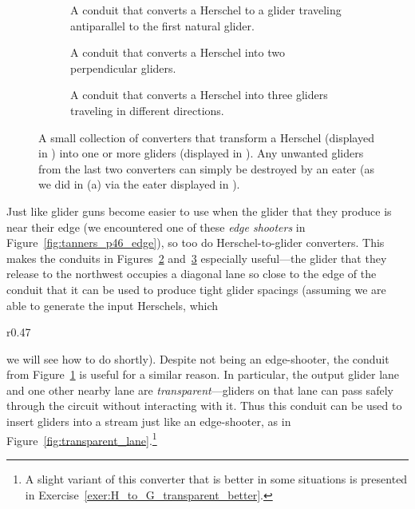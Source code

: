 \begin{figure}[!htb]
	\centering
	\begin{subfigure}{.3\textwidth}
		\centering\vspace*{0.4cm}
		\caption{A conduit that converts a Herschel to a glider traveling antiparallel to the first natural glider.}
		\label{fig:H_to_G}
	\end{subfigure}\quad%
	\begin{subfigure}{.31\textwidth}
		\centering{}
		\caption{A conduit that converts a Herschel into two perpendicular gliders.}
		\label{fig:H_to_2G}
	\end{subfigure}\quad%
	\begin{subfigure}{.31\textwidth}
		\centering{}
		\caption{A conduit that converts a Herschel into three gliders traveling in different directions.}
		\label{fig:H_to_3G}
	\end{subfigure}
	\caption{A small collection of converters that transform a Herschel (displayed in ) into one or more gliders (displayed in ). Any unwanted gliders from the last two converters can simply be destroyed by an eater (as we did in (a) via the eater displayed in ).}\label{fig:herschel_to_glider}
\end{figure}

Just like glider guns become easier to use when the glider that they produce is near their edge (we encountered one of these \emph{edge shooters} in Figure~\ref{fig:tanners_p46_edge}), so too do Herschel-to-glider converters. This makes the conduits in Figures~\ref{fig:H_to_2G} and~\ref{fig:H_to_3G} especially useful---the glider that they release to the northwest occupies a diagonal lane so close to the edge of the conduit that it can be used to produce tight glider spacings (assuming we are able to generate the input Herschels, which
\begin{wrapfigure}{r}{0.47\textwidth}
	\centering
	\caption{A conduit with a transparent lane inserting a glider into a period~$60$ stream.}\label{fig:transparent_lane}
\end{wrapfigure}
we will see how to do shortly). Despite not being an edge-shooter, the conduit from Figure~\ref{fig:H_to_G} is useful for a similar reason. In particular, the output glider lane and one other nearby lane are \emph{transparent}---gliders on that lane can pass safely through the circuit without interacting with it. Thus this conduit can be used to insert gliders into a stream just like an edge-shooter, as in Figure~\ref{fig:transparent_lane}.\footnote{A slight variant of this converter that is better in some situations is presented in Exercise~\ref{exer:H_to_G_transparent_better}.}

